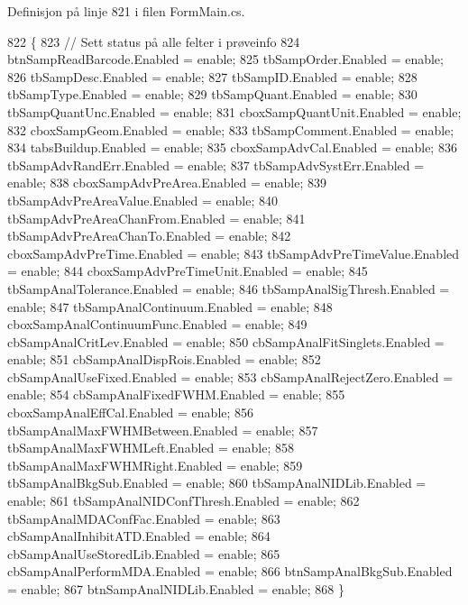 Definisjon på linje 821 i filen Form\+Main.\+cs.


\begin{DoxyCode}
822         \{
823             \textcolor{comment}{// Sett status på alle felter i prøveinfo}
824             btnSampReadBarcode.Enabled = enable;
825             tbSampOrder.Enabled = enable;
826             tbSampDesc.Enabled = enable;
827             tbSampID.Enabled = enable;
828             tbSampType.Enabled = enable;
829             tbSampQuant.Enabled = enable;
830             tbSampQuantUnc.Enabled = enable;
831             cboxSampQuantUnit.Enabled = enable;
832             cboxSampGeom.Enabled = enable;
833             tbSampComment.Enabled = enable;
834             tabsBuildup.Enabled = enable;
835             cboxSampAdvCal.Enabled = enable;
836             tbSampAdvRandErr.Enabled = enable;
837             tbSampAdvSystErr.Enabled = enable;
838             cboxSampAdvPreArea.Enabled = enable;
839             tbSampAdvPreAreaValue.Enabled = enable;
840             tbSampAdvPreAreaChanFrom.Enabled = enable;
841             tbSampAdvPreAreaChanTo.Enabled = enable;
842             cboxSampAdvPreTime.Enabled = enable;
843             tbSampAdvPreTimeValue.Enabled = enable;
844             cboxSampAdvPreTimeUnit.Enabled = enable;
845             tbSampAnalTolerance.Enabled = enable;
846             tbSampAnalSigThresh.Enabled = enable;
847             tbSampAnalContinuum.Enabled = enable;
848             cboxSampAnalContinuumFunc.Enabled = enable;
849             cbSampAnalCritLev.Enabled = enable;
850             cbSampAnalFitSinglets.Enabled = enable;
851             cbSampAnalDispRois.Enabled = enable;
852             cbSampAnalUseFixed.Enabled = enable;
853             cbSampAnalRejectZero.Enabled = enable;
854             cbSampAnalFixedFWHM.Enabled = enable;
855             cboxSampAnalEffCal.Enabled = enable;
856             tbSampAnalMaxFWHMBetween.Enabled = enable;
857             tbSampAnalMaxFWHMLeft.Enabled = enable;
858             tbSampAnalMaxFWHMRight.Enabled = enable;
859             tbSampAnalBkgSub.Enabled = enable;
860             tbSampAnalNIDLib.Enabled = enable;
861             tbSampAnalNIDConfThresh.Enabled = enable;
862             tbSampAnalMDAConfFac.Enabled = enable;
863             cbSampAnalInhibitATD.Enabled = enable;
864             cbSampAnalUseStoredLib.Enabled = enable;
865             cbSampAnalPerformMDA.Enabled = enable;
866             btnSampAnalBkgSub.Enabled = enable;
867             btnSampAnalNIDLib.Enabled = enable;
868         \}
\end{DoxyCode}
